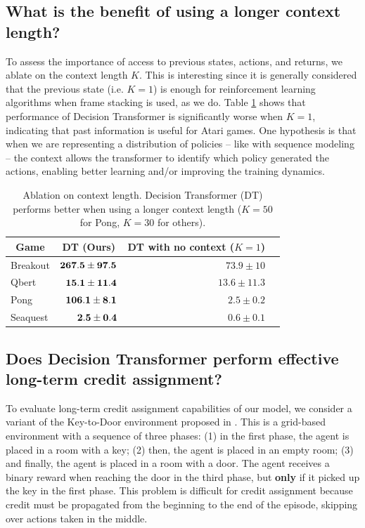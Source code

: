 \subsection{What is the benefit of using a longer context length?}
\label{sec:context_atari}

To assess the importance of access to previous states, actions, and returns, we ablate on the context length $K$.
This is interesting since it is generally considered that the previous state (i.e. $K=1$) is enough for reinforcement learning algorithms when frame stacking is used, as we do.
Table \ref{tbl:atari_history} shows that performance of Decision Transformer is significantly worse when $K=1$, indicating that past information is useful for Atari games.
One hypothesis is that when we are representing a distribution of policies -- like with sequence modeling -- the context allows the transformer to identify which policy generated the actions, enabling better learning and/or improving the training dynamics.

\begin{table}[h]
\centering
\small
\begin{tabular}{lrrr}
\toprule
\multicolumn{1}{c}{\bf Game} & \multicolumn{1}{c}{\bf DT (Ours)} & \multicolumn{1}{c}{\bf DT with no context ($K=1$)} &  \\
  \midrule
Breakout  & $\bf{267.5} \pm 97.5$ & $73.9 \pm 10$  \\
Qbert    & $\bf{15.1} \pm 11.4$ & $13.6 \pm 11.3$ \\
Pong      & $\bf{106.1} \pm 8.1$ & $2.5 \pm 0.2$ \\
Seaquest  & $\bf{2.5} \pm 0.4$ & $0.6 \pm 0.1$ \\
\bottomrule
\end{tabular}
\caption{Ablation on context length.
Decision Transformer (DT) performs better when using a longer context length ($K=50$ for Pong, $K=30$ for others).}
\label{tbl:atari_history}
\end{table}

\subsection{Does Decision Transformer perform effective long-term credit assignment?}
\label{sec:key_to_door}

To evaluate long-term credit assignment capabilities of our model, we consider a variant of the Key-to-Door environment proposed in \citet{mesnard2020counterfactual}.
This is a grid-based environment with a sequence of three phases: (1) in the first phase, the agent is placed in a room with a key; (2) then, the agent is placed in an empty room; (3) and finally, the agent is placed in a room with a door.
The agent receives a binary reward when reaching the door in the third phase, but \textbf{only} if it picked up the key in the first phase.
This problem is difficult for credit assignment because credit must be propagated from the beginning to the end of the episode, skipping over actions taken in the middle.

